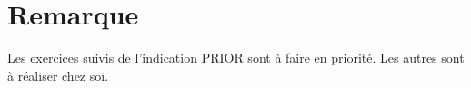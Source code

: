 \vspace{-3mm}
\section*{Remarque}
\vspace{-6mm}
Les exercices suivis de l’indication PRIOR sont à faire en priorité. Les autres sont à réaliser chez soi.

